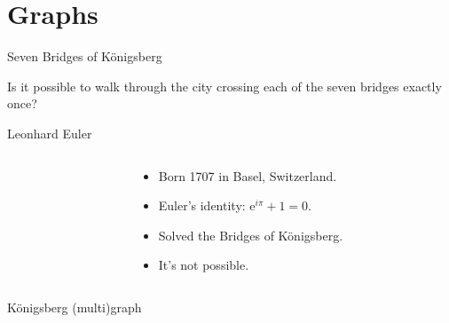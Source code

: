 \documentclass{beamer}
\begin{document}
\section{Graphs}

\begin{frame}{Seven Bridges of K{\"o}nigsberg}
    \begin{alertblock}{Is it possible to walk through the city crossing each of the seven bridges exactly once?}
    \begin{center}
    \end{center}
  \end{alertblock}
  \end{frame}
  
  \begin{frame}{Leonhard Euler}  
    \begin{columns}[T]
      \begin{column}{0.3\textwidth}
      \end{column}
      \begin{column}{0.65\textwidth}
        \begin{itemize}
          \setlength\itemsep{3mm}
          \item Born 1707 in Basel, Switzerland.
          \item Euler's identity: $\mathrm{e}^{i \pi} + 1 = 0$.
          \item Solved the Bridges of K{\"o}nigsberg.
          \item It's not possible.
        \end{itemize}
      \end{column}
    
    \end{columns}
  \end{frame}
  
  \begin{frame}{K{\"o}nigsberg (multi)graph}
    \vspace{10mm}
    \begin{adjustbox}{max width={0.9\textwidth},center} 
    \end{adjustbox}
  \end{frame}
  
\end{document}
